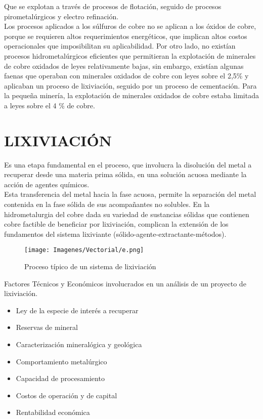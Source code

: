 Que se explotan a trav\'es de procesos de flotaci\'on, seguido de procesos pirometal\'urgicos y electro refinaci\'on.\\ 
Los procesos aplicados a los s\'ulfuros de cobre no se aplican a los \'oxidos de cobre, porque se requieren altos requerimientos energ\'eticos, que implican altos costos operacionales que imposibilitan su aplicabilidad. Por otro lado, no exist\'ian procesos hidrometal\'urgicos eficientes que permitieran la explotaci\'on de minerales de cobre oxidados de leyes relativamente bajas, sin embargo, existían algunas faenas que operaban con minerales oxidados de cobre con leyes sobre el 2,5\% y aplicaban un proceso de lixiviaci\'on, seguido por un proceso de cementaci\'on. Para la peque\~na miner\'ia, la explotaci\'on de minerales oxidados de cobre estaba limitada a leyes sobre el 4 \% de cobre.\\

\section{LIXIVIACI\'ON}
Es una etapa fundamental en el proceso, que involucra la disoluci\'on del metal a recuperar desde una materia prima s\'olida, en una soluci\'on acuosa mediante la acci\'on de agentes qu\'imicos.\\
Esta transferencia del metal hacia la fase acuosa, permite la separaci\'on del metal contenida en la fase s\'olida de sus acompa\~nantes no solubles. En la hidrometalurgia del cobre dada su variedad de sustancias s\'olidas que contienen cobre factible de beneficiar por lixiviaci\'on, complican la extensi\'on de los fundamentos del sistema lixiviante (s\'olido-agente-extractante-m\'etodos).

\begin{figure}[H]
 \centering
 \texttt{[image: Imagenes/Vectorial/e.png]}
 \caption{Proceso t\'ipico de un sistema de lixiviaci\'on}
 \label{fig:e}
\end{figure}

Factores T\'ecnicos y Econ\'omicos involucrados en un an\'alisis de un proyecto de lixiviaci\'on.
\begin{itemize}
 \item Ley de la especie de inter\'es a recuperar
 \item Reservas de mineral
 \item Caracterizaci\'on mineral\'ogica y geol\'ogica
 \item Comportamiento metal\'urgico
 \item Capacidad de procesamiento
 \item Costos de operaci\'on y de capital
 \item Rentabilidad econ\'omica
\end{itemize}

